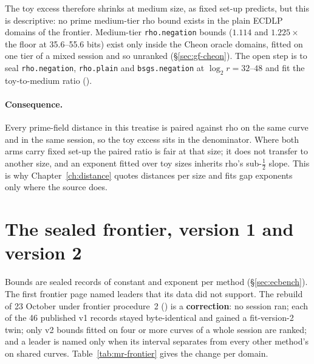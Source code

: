 The toy excess therefore shrinks at medium size, as fixed set-up predicts,
but this is descriptive: no prime medium-tier rho bound exists in the plain
ECDLP domains of the frontier. Medium-tier \texttt{rho.negation} bounds
($1.114$ and $1.225\times$ the floor at 35.6--55.6 bits) exist only inside
the Cheon oracle domains, fitted on one tier of a mixed session and so
unranked (\S\ref{sec:gf-cheon}). The open step is to seal \texttt{rho.negation},
\texttt{rho.plain} and \texttt{bsgs.negation} at $\log_2r=32$--$48$ and fit
the toy-to-medium ratio
().

\paragraph{Consequence.} Every prime-field distance in this treatise is
paired against rho on the same curve and in the same session, so the toy
excess sits in the denominator. Where both arms carry fixed set-up the
paired ratio is fair at that size; it does not transfer to another size,
and an exponent fitted over toy sizes inherits rho's sub-$\tfrac12$ slope.
This is why Chapter~\ref{ch:distance} quotes distances per size and fits
gap exponents only where the source does.

\section{The sealed frontier, version 1 and version 2}\label{sec:mr-frontier}

Bounds are sealed records of constant and exponent per method
(\S\ref{sec:ecbench}). The first frontier page named leaders that its data
did not support. The rebuild of 23 October under frontier procedure~2
() is a \textbf{correction}:
no session ran; each of the 46 published v1 records stayed byte-identical
and gained a fit-version-2 twin; only v2 bounds fitted on four or more
curves of a whole session are ranked; and a leader is named only when its
interval separates from every other method's on shared curves.
Table~\ref{tab:mr-frontier} gives the change per domain.

